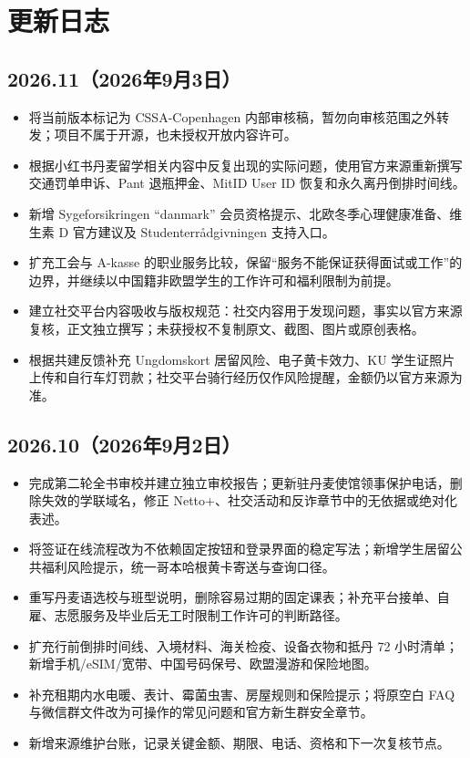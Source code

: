 \section{更新日志}

\subsection*{2026.11（2026年9月3日）}
\begin{itemize}
  \item 将当前版本标记为 CSSA-Copenhagen 内部审核稿，暂勿向审核范围之外转发；项目不属于开源，也未授权开放内容许可。
  \item 根据小红书丹麦留学相关内容中反复出现的实际问题，使用官方来源重新撰写交通罚单申诉、Pant 退瓶押金、MitID User ID 恢复和永久离丹倒排时间线。
  \item 新增 Sygeforsikringen ``danmark'' 会员资格提示、北欧冬季心理健康准备、维生素 D 官方建议及 Studenterrådgivningen 支持入口。
  \item 扩充工会与 A-kasse 的职业服务比较，保留“服务不能保证获得面试或工作”的边界，并继续以中国籍非欧盟学生的工作许可和福利限制为前提。
  \item 建立社交平台内容吸收与版权规范：社交内容用于发现问题，事实以官方来源复核，正文独立撰写；未获授权不复制原文、截图、图片或原创表格。
  \item 根据共建反馈补充 Ungdomskort 居留风险、电子黄卡效力、KU 学生证照片上传和自行车灯罚款；社交平台骑行经历仅作风险提醒，金额仍以官方来源为准。
\end{itemize}

\subsection*{2026.10（2026年9月2日）}
\begin{itemize}
  \item 完成第二轮全书审校并建立独立审校报告；更新驻丹麦使馆领事保护电话，删除失效的学联域名，修正 Netto+、社交活动和反诈章节中的无依据或绝对化表述。
  \item 将签证在线流程改为不依赖固定按钮和登录界面的稳定写法；新增学生居留公共福利风险提示，统一哥本哈根黄卡寄送与查询口径。
  \item 重写丹麦语选校与班型说明，删除容易过期的固定课表；补充平台接单、自雇、志愿服务及毕业后无工时限制工作许可的判断路径。
  \item 扩充行前倒排时间线、入境材料、海关检疫、设备衣物和抵丹 72 小时清单；新增手机/eSIM/宽带、中国号码保号、欧盟漫游和保险地图。
  \item 补充租期内水电暖、表计、霉菌虫害、房屋规则和保险提示；将原空白 FAQ 与微信群文件改为可操作的常见问题和官方新生群安全章节。
  \item 新增来源维护台账，记录关键金额、期限、电话、资格和下一次复核节点。
\end{itemize}

